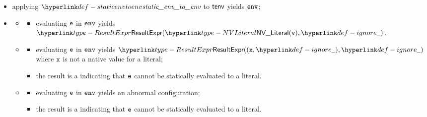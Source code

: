 \ProseParagraph
\AllApply
\begin{itemize}
  \item applying $\staticenvtoenv$ to $\tenv$ yields $\env$;
  \item \OneApplies
  \begin{itemize}
    \item {}
    \begin{itemize}
      \item evaluating $\ve$ in $\env$ yields $\ResultExpr(\NVLiteral(\vv), \Ignore)$.
    \end{itemize}

    \item {}
    \begin{itemize}
      \item evaluating $\ve$ in $\env$ yields $\ResultExpr((\vx, \Ignore), \Ignore)$
            where $\vx$ is not a native value for a literal;
      \item the result is a \typingerrorterm{} indicating that $\ve$ cannot be statically evaluated to a literal.
    \end{itemize}

    \item {}
    \begin{itemize}
      \item evaluating $\ve$ in $\env$ yields an abnormal configuration;
      \item the result is a \typingerrorterm{} indicating that $\ve$ cannot be statically evaluated to a literal.
    \end{itemize}
  \end{itemize}
\end{itemize}

\FormallyParagraph
\begin{mathpar}
\end{mathpar}

\begin{mathpar}
\end{mathpar}

